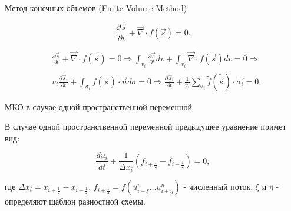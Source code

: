 \documentclass[12pt,xcolor=pst,aspectratio=169]{beamer}
\begin{document}
\begin{frame}{Метод конечных объемов (Finite Volume Method)}

	\transdissolve[duration=0.1]
	\justifying
	\large

	\[
		\frac{\partial \vec{s}}{\partial t} + \vec{\nabla} \cdot f (\vec{s}) = 0.
	\]
	
	\[
		\begin{split}
			&\frac{\partial \vec{s}}{\partial t} + \vec{\nabla} \cdot f (\vec{s}) = 0 \Rightarrow
			\int_{v_{i}} \frac{\partial \vec{s}}{\partial t} d v + \int_{v_{i}} \vec{\nabla} \cdot f (\vec{s}) d v = 0 \Rightarrow \\
			&v_{i} \frac{\partial \tilde{\vec{s}}_{i}}{\partial t} + \int_{\sigma_{i}} f (\vec{s}) \cdot \vec{n} d \sigma = 0 \Rightarrow
			\frac{\partial \tilde{\vec{s}}_{i}}{\partial t} + \frac{1}{v_{i}} \sum_{\sigma_{i}} \tilde{f} (\tilde{\vec{s}}) \cdot \vec{\sigma_{i}} = 0.
		\end{split}
	\]

\end{frame}

\begin{frame}{МКО в случае одной пространственной переменной}

	\transdissolve[duration=0.1]
	\justifying
	\large

	В случае одной пространственной переменной предыдущее уравнение примет вид:
	
	\[
		\frac{d u_{i}}{d t} + \frac{1}{\Delta x_{i}} \left( f_{i + \frac{1}{2}} - f_{i - \frac{1}{2}} \right) = 0,
	\]

	где $\Delta x_{i} = x_{i + \frac{1}{2}} - x_{i - \frac{1}{2}}$, $f_{i + \frac{1}{2}} = f \left( u^{n}_{i - \xi} \ldots u^{n}_{i + \eta} \right)$ - численный поток, $\xi$ и $\eta$ - определяют шаблон разностной схемы.

\end{frame}
\end{document}
